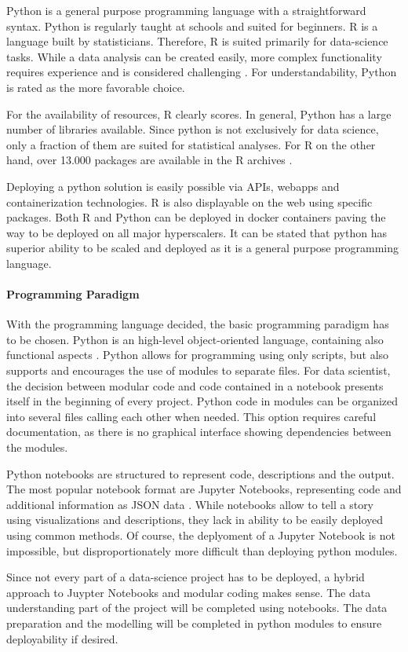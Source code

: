 Python is a general purpose programming language with a straightforward syntax. Python is regularly taught at schools and suited for beginners. R is a language built by statisticians. Therefore, R is suited primarily for data-science tasks. While a data analysis can be created easily, more complex functionality requires experience and is considered challenging \cite{pythonVsR}. For understandability, Python is rated as the more favorable choice.

For the availability of resources, R clearly scores. In general, Python has a large number of libraries available. Since python is not exclusively for data science, only a fraction of them are suited for statistical analyses. For R on the other hand, over 13.000 packages are available in the R archives \cite{pythonVsR}.

Deploying a python solution is easily possible via APIs, webapps and containerization technologies. R is also displayable on the web using specific packages. Both R and Python can be deployed in docker containers \cite{rDocker} \cite{pythonDocker} paving the way to be deployed on all major hyperscalers.
It can be stated that python has superior ability to be scaled and deployed as it is a general purpose programming language. 

\paragraph{Programming Paradigm}
With the programming language decided, the basic programming paradigm has to be chosen. Python is an high-level object-oriented language, containing also functional aspects \cite[chapter~1.3.2]{corePython}. Python allows for programming using only scripts, but also supports and encourages the use of modules to separate files.
For data scientist, the decision between modular code and code contained in a notebook presents itself in the beginning of every project. Python code in modules can be organized into several files calling each other when needed. This option requires careful documentation, as there is no graphical interface showing dependencies between the modules.

Python notebooks are structured to represent code, descriptions and the output. The most popular notebook format are Jupyter Notebooks, representing code and additional information as \ac{JSON} data \cite{jupyterteamArchitecture}.
While notebooks allow to tell a story using visualizations and descriptions, they lack in ability to be easily deployed using common methods. Of course, the deplyoment of a Jupyter Notebook is not impossible, but disproportionately more difficult than deploying python modules.

Since not every part of a data-science project has to be deployed, a hybrid approach to Juypter Notebooks and modular coding makes sense. The data understanding part of the project will be completed using notebooks. The data preparation and the modelling will be completed in python modules to ensure deployability if desired.












